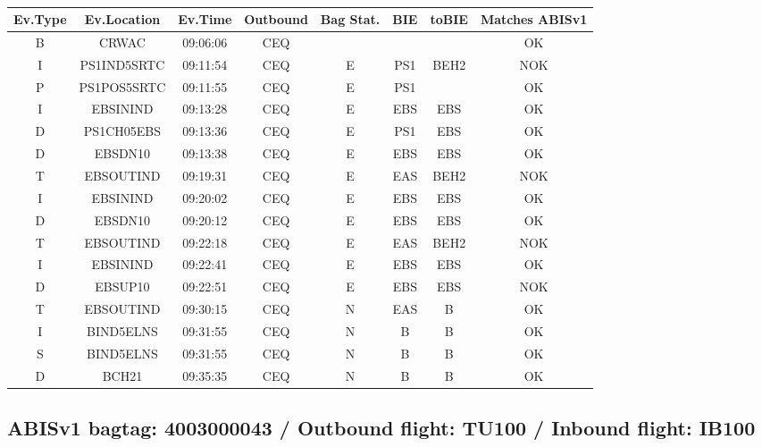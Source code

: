 \documentclass{report}
\begin{document}
\paragraph{}
\begin{longtable}{cccccccc}    \toprule
\rowcolor{white!50}
\textbf{Ev.Type} & \textbf{Ev.Location} & \textbf{Ev.Time} & \textbf{Outbound} & \textbf{Bag Stat.} & \textbf{BIE} & \textbf{toBIE} & \textbf{Matches ABISv1} \\\midrule
B & CRWAC & 09:06:06  & CEQ &  &  &  & OK\\
I & PS1IND5SRTC & 09:11:54  & CEQ & E & PS1 & BEH2 & NOK\\
P & PS1POS5SRTC & 09:11:55  & CEQ & E & PS1 &  & OK\\
I & EBSININD & 09:13:28  & CEQ & E & EBS & EBS & OK\\
D & PS1CH05EBS & 09:13:36  & CEQ & E & PS1 & EBS & OK\\
D & EBSDN10 & 09:13:38  & CEQ & E & EBS & EBS & OK\\
T & EBSOUTIND & 09:19:31  & CEQ & E & EAS & BEH2 & NOK\\
I & EBSININD & 09:20:02  & CEQ & E & EBS & EBS & OK\\
D & EBSDN10 & 09:20:12  & CEQ & E & EBS & EBS & OK\\
T & EBSOUTIND & 09:22:18  & CEQ & E & EAS & BEH2 & NOK\\
I & EBSININD & 09:22:41  & CEQ & E & EBS & EBS & OK\\
D & EBSUP10 & 09:22:51  & CEQ & E & EBS & EBS & NOK\\
T & EBSOUTIND & 09:30:15  & CEQ & N & EAS & B & OK\\
I & BIND5ELNS & 09:31:55  & CEQ & N & B & B & OK\\
S & BIND5ELNS & 09:31:55  & CEQ & N & B & B & OK\\
D & BCH21 & 09:35:35  & CEQ & N & B & B & OK\\
\bottomrule
\end{longtable}
\subsection*{ABISv1 bagtag: 4003000043 / Outbound flight: TU100 / Inbound flight: IB100}
\end{document}
